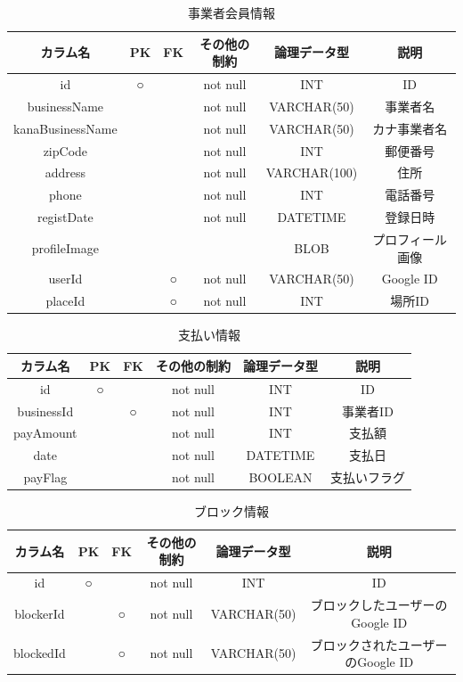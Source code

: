 \begin{table}[H]
    \centering
    \caption{事業者会員情報}
    \label{tb:business}
    \begin{tabular}{|c|c|c|c|c|c|} \hline
        カラム名 & PK & FK & その他の制約 & 論理データ型 & 説明 \\ \hline\hline
        id & ○ & & not null & INT & ID \\ \hline
        businessName & & & not null & VARCHAR(50) & 事業者名 \\ \hline
        kanaBusinessName & & & not null & VARCHAR(50) & カナ事業者名 \\ \hline
        zipCode & & & not null & INT & 郵便番号 \\ \hline
        address & & & not null & VARCHAR(100) & 住所 \\ \hline
        phone & & & not null & INT & 電話番号 \\ \hline
        registDate & & & not null & DATETIME & 登録日時 \\ \hline
        profileImage & & & & BLOB & プロフィール画像 \\ \hline
        userId & & ○ & not null & VARCHAR(50) & Google ID \\ \hline
        placeId & & ○ & not null & INT & 場所ID \\ \hline
    \end{tabular}
\end{table}

\begin{table}[H]
    \centering
    \caption{支払い情報}
    \label{tb:pay}
    \begin{tabular}{|c|c|c|c|c|c|} \hline
        カラム名 & PK & FK & その他の制約 & 論理データ型 & 説明 \\ \hline\hline
        id & ○ & & not null & INT & ID \\ \hline
        businessId & & ○ & not null & INT & 事業者ID \\ \hline
        payAmount & & & not null & INT & 支払額 \\ \hline
        date & & & not null & DATETIME & 支払日 \\ \hline
        payFlag & & & not null & BOOLEAN & 支払いフラグ \\ \hline
    \end{tabular}
\end{table}

\begin{table}[H]
    \centering
    \caption{ブロック情報}
    \label{tb:block}
    \begin{tabular}{|c|c|c|c|c|c|} \hline
        カラム名 & PK & FK & その他の制約 & 論理データ型 & 説明 \\ \hline\hline
        id & ○ & & not null & INT & ID \\ \hline
        blockerId & & ○ & not null & VARCHAR(50) & ブロックしたユーザーのGoogle ID \\ \hline
        blockedId & & ○ & not null & VARCHAR(50) & ブロックされたユーザーのGoogle ID \\ \hline
    \end{tabular}
\end{table}

